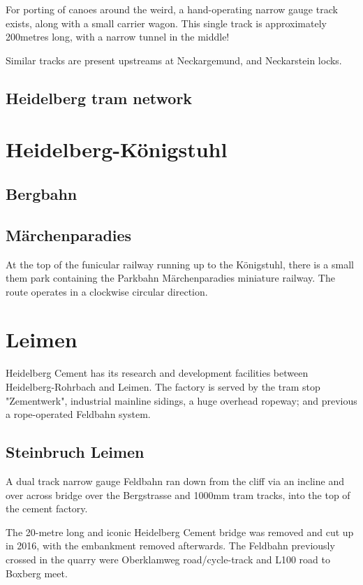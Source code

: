 \documentclass[a4paper]{report}
\begin{document}
For porting of canoes around the weird, a hand-operating narrow gauge
track exists, along with a small carrier wagon.  This single track is
approximately 200metres long, with a narrow tunnel in the middle!

Similar tracks are present upstreams at Neckargemund, and Neckarstein locks.

\subsection{Heidelberg tram network}

\section{Heidelberg-Königstuhl}

\subsection{Bergbahn}

\subsection{Märchenparadies}

At the top of the funicular railway running up to the Königstuhl,
there is a small them park containing the Parkbahn Märchenparadies
miniature railway.  The route operates in a clockwise circular
direction.

\section{Leimen}

Heidelberg Cement has its research and development facilities between
Heidelberg-Rohrbach and Leimen.  The factory is served by the tram
stop "Zementwerk", industrial mainline sidings, a huge overhead
ropeway; and previous a rope-operated Feldbahn system.

\subsection{Steinbruch Leimen}

A dual track narrow gauge Feldbahn ran down from the cliff via an
incline and over across bridge over the Bergstrasse and 1000mm tram
tracks, into the top of the cement factory.

The 20-metre long and iconic Heidelberg Cement bridge was removed and
cut up in 2016, with the embankment removed afterwards.  The Feldbahn
previously crossed in the quarry were Oberklamweg road/cycle-track and
L100 road to Boxberg meet.
\end{document}
